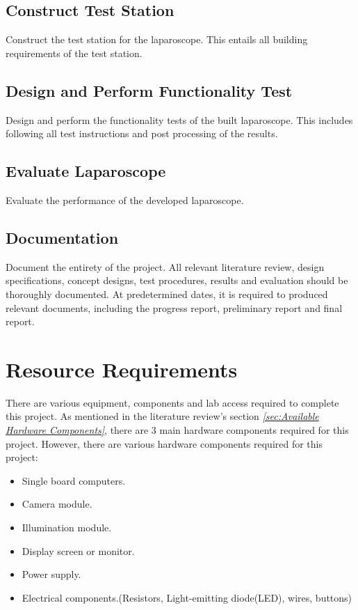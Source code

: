 \subsection{Construct Test Station}

Construct the test station for the laparoscope. This entails all building requirements of the test station.

\subsection{Design and Perform Functionality Test}

Design and perform the functionality tests of the built laparoscope. This includes following all test instructions and post processing of the results.

\subsection{Evaluate Laparoscope}

Evaluate the performance of the developed laparoscope. 

\subsection{Documentation}

Document the entirety of the project. All relevant literature review, design specifications, concept designs, test procedures, results and evaluation should be thoroughly documented. At predetermined dates, it is required to produced relevant documents, including the progress report, preliminary report and final report. 

\section{Resource Requirements} 

There are various equipment, components and lab access required to complete this project. As mentioned in the literature review's section \textit{\ref{sec:Available Hardware Components}}, there are 3 main hardware components required for this project. However, there are various hardware components required for this project:

\begin{itemize}
    \item Single board computers.
    \item Camera module.
    \item Illumination module.
    \item Display screen or monitor.
    \item Power supply.
    \item Electrical components.(Resistors, Light-emitting diode(LED), wires, buttons)
\end{itemize}

